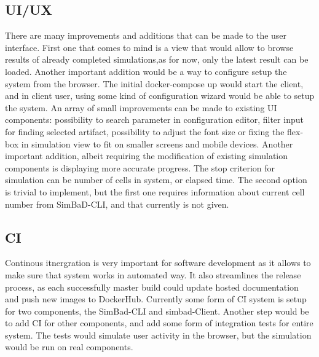 \subsection{UI/UX}
There are many improvements and additions that can be made to the user interface. First one that comes to mind is a view that would allow to browse results of already completed simulations,as for now, only the latest result can be loaded. Another important addition would be a way to configure setup the system from the browser. The initial docker-compose up would start the client, and in client user, using some kind of configuration wizard would be able to setup the system. An array of small improvements can be made to existing UI components: possibility to search parameter in configuration editor, filter input for finding selected artifact, possibility to adjust the font size or fixing the flex-box in simulation view to fit on smaller screens and mobile devices. Another important addition, albeit requiring the modification of existing simulation components is displaying more accurate progress. The stop criterion for simulation can be number of cells in system, or elapsed time. The second option is trivial to implement, but the first one requires information about current cell number from SimBaD-CLI, and that currently is not given.
\subsection{CI}
Continous itnergration is very important for software development as it allows to make sure that system works in automated way. It also streamlines the release process, as each successfully master build could update hosted documentation and push new images to DockerHub. Currently some form of CI system is setup for two components, the SimBad-CLI and simbad-Client. Another step would be to add CI for other components, and add some form of integration tests for entire system. The tests would simulate user activity in the browser, but the simulation would be run on real components. 
